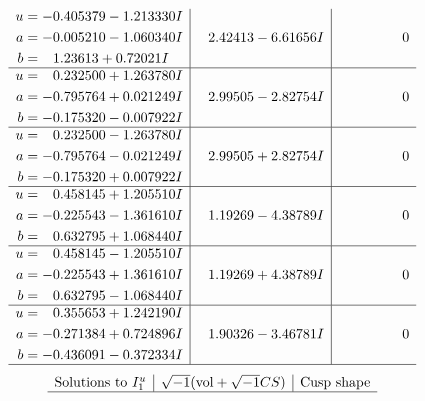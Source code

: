 \documentclass[1p]{elsarticle_modified}
\theoremstyle{definition}
\newcommand{\I}{\sqrt{-1}}
\begin{document}
$$\begin{array}{c|c|c}
\begin{aligned}
u &= -0.405379 - 1.213330 I \\
a &= -0.005210 - 1.060340 I \\
b &= \phantom{-}1.23613 + 0.72021 I\end{aligned}
 & \phantom{-}2.42413 - 6.61656 I & \phantom{-0.000000 } 0 \\ \hline\begin{aligned}
u &= \phantom{-}0.232500 + 1.263780 I \\
a &= -0.795764 + 0.021249 I \\
b &= -0.175320 - 0.007922 I\end{aligned}
 & \phantom{-}2.99505 - 2.82754 I & \phantom{-0.000000 } 0 \\ \hline\begin{aligned}
u &= \phantom{-}0.232500 - 1.263780 I \\
a &= -0.795764 - 0.021249 I \\
b &= -0.175320 + 0.007922 I\end{aligned}
 & \phantom{-}2.99505 + 2.82754 I & \phantom{-0.000000 } 0 \\ \hline\begin{aligned}
u &= \phantom{-}0.458145 + 1.205510 I \\
a &= -0.225543 - 1.361610 I \\
b &= \phantom{-}0.632795 + 1.068440 I\end{aligned}
 & \phantom{-}1.19269 - 4.38789 I & \phantom{-0.000000 } 0 \\ \hline\begin{aligned}
u &= \phantom{-}0.458145 - 1.205510 I \\
a &= -0.225543 + 1.361610 I \\
b &= \phantom{-}0.632795 - 1.068440 I\end{aligned}
 & \phantom{-}1.19269 + 4.38789 I & \phantom{-0.000000 } 0 \\ \hline\begin{aligned}
u &= \phantom{-}0.355653 + 1.242190 I \\
a &= -0.271384 + 0.724896 I \\
b &= -0.436091 - 0.372334 I\end{aligned}
 & \phantom{-}1.90326 - 3.46781 I & \phantom{-0.000000 } 0\\
 \hline 
 \end{array}$$\newpage$$\begin{array}{c|c|c}  
\text{Solutions to }I^u_{1}& \I (\text{vol} + \sqrt{-1}CS) & \text{Cusp shape}\\
 \hline 

\end{array}$$
\end{document}
